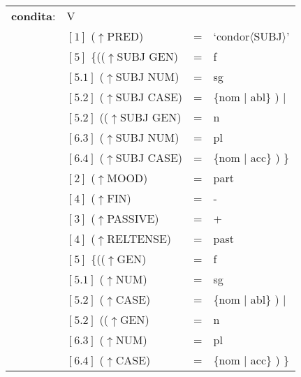 \documentclass[12pt,a4paper]{article}
\begin{document}
\begin{singlespace}
\begin{tabular}{ l  l  l  l  } 
\textbf{condita}: & V \\
$\qquad$ & $[1]$ \:  ($\uparrow$PRED) & = & `condor$\langle$SUBJ$\rangle$'\\
$\qquad$ & $[5]$ \:  \{(($\uparrow$SUBJ GEN) & = & f \\ 
$\qquad$ & $[5.1]$ \:  ($\uparrow$SUBJ NUM) & = & sg \\
$\qquad$ & $[5.2]$ \:  ($\uparrow$SUBJ CASE) & = & \{nom $\mid$ abl\} ) $\mid$\\
$\qquad$ & $[5.2]$ \: (($\uparrow$SUBJ GEN) & = & n \\
$\qquad$ & $[6.3]$ \:  ($\uparrow$SUBJ NUM) & = & pl \\
$\qquad$ & $[6.4]$ \:  ($\uparrow$SUBJ CASE) & = & \{nom $\mid$ acc\} ) \}\\
$\qquad$ & $[2]$ \:  ($\uparrow$MOOD) & = & part\\
$\qquad$ & $[4]$ \:  ($\uparrow$FIN) & = & - \\
$\qquad$ & $[3]$ \:  ($\uparrow$PASSIVE) & = & + \\
$\qquad$ & $[4]$ \:  ($\uparrow$RELTENSE) & = & past \\
$\qquad$ & $[5]$ \:  \{(($\uparrow$GEN) & = & f \\ 
$\qquad$ & $[5.1]$ \:  ($\uparrow$NUM) & = & sg \\
$\qquad$ & $[5.2]$ \:  ($\uparrow$CASE) & = & \{nom $\mid$ abl\} ) $\mid$\\
$\qquad$ & $[5.2]$ \: (($\uparrow$GEN) & = & n \\
$\qquad$ & $[6.3]$ \:  ($\uparrow$NUM) & = & pl \\
$\qquad$ & $[6.4]$ \:  ($\uparrow$CASE) & = & \{nom $\mid$ acc\} ) \}\\
\end{tabular}
\newline
\end{singlespace}
\end{document}
